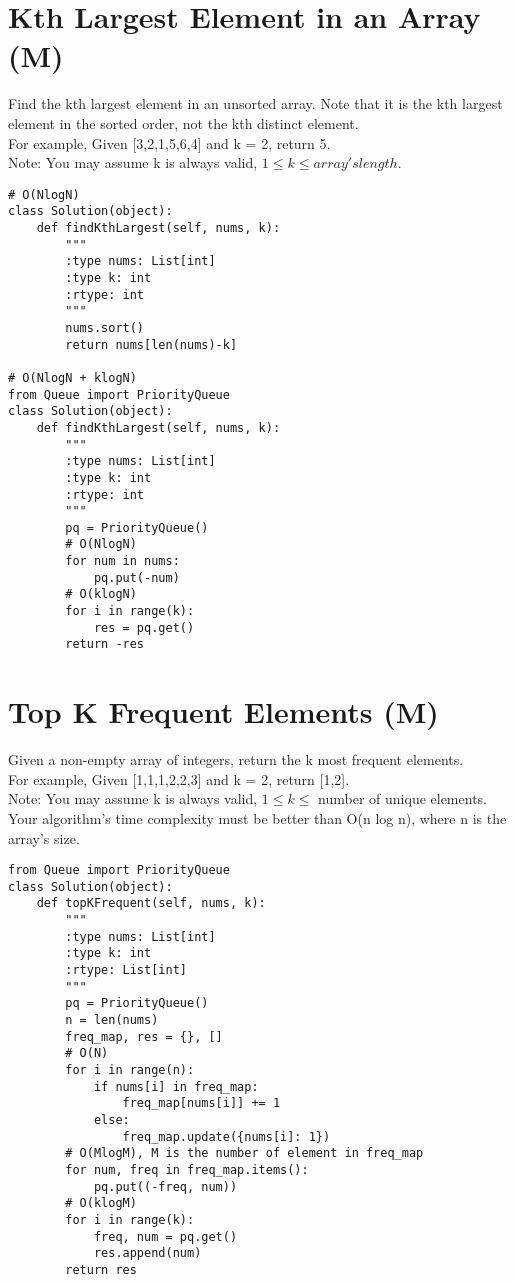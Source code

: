 \section{Kth Largest Element in an Array (M)}
Find the kth largest element in an unsorted array. Note that it is the kth largest element in the sorted order, not the kth distinct element.\\

For example,
Given [3,2,1,5,6,4] and k = 2, return 5.\\

Note:
You may assume k is always valid, $1 \leq k \leq array's length$.\\

\begin{lstlisting}
# O(NlogN)
class Solution(object):
    def findKthLargest(self, nums, k):
        """
        :type nums: List[int]
        :type k: int
        :rtype: int
        """
        nums.sort()
        return nums[len(nums)-k]
        
# O(NlogN + klogN)
from Queue import PriorityQueue
class Solution(object):
    def findKthLargest(self, nums, k):
        """
        :type nums: List[int]
        :type k: int
        :rtype: int
        """
        pq = PriorityQueue()
        # O(NlogN)
        for num in nums:
            pq.put(-num)
        # O(klogN)
        for i in range(k):
            res = pq.get()
        return -res
\end{lstlisting}

\section{Top K Frequent Elements (M)}
Given a non-empty array of integers, return the k most frequent elements.\\

For example,
Given [1,1,1,2,2,3] and k = 2, return [1,2].\\

Note:
    You may assume k is always valid, $1 \leq k \leq $ number of unique elements.\\
    Your algorithm's time complexity must be better than O(n log n), where n is the array's size.\\

\begin{lstlisting}
from Queue import PriorityQueue
class Solution(object):
    def topKFrequent(self, nums, k):
        """
        :type nums: List[int]
        :type k: int
        :rtype: List[int]
        """
        pq = PriorityQueue()
        n = len(nums)
        freq_map, res = {}, []
        # O(N)
        for i in range(n):
            if nums[i] in freq_map:
                freq_map[nums[i]] += 1
            else:
                freq_map.update({nums[i]: 1})
        # O(MlogM), M is the number of element in freq_map
        for num, freq in freq_map.items():
            pq.put((-freq, num))
        # O(klogM)
        for i in range(k):
            freq, num = pq.get()
            res.append(num)
        return res
\end{lstlisting}        
        

